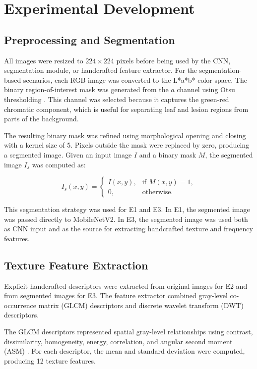 \section{Experimental Development}

\subsection{Preprocessing and Segmentation}

All images were resized to $224 \times 224$ pixels before being used by the CNN, segmentation module, or handcrafted feature extractor. For the segmentation-based scenarios, each RGB image was converted to the L*a*b* color space. The binary region-of-interest mask was generated from the $a$ channel using Otsu thresholding \cite{otsu1979threshold}. This channel was selected because it captures the green-red chromatic component, which is useful for separating leaf and lesion regions from parts of the background.

The resulting binary mask was refined using morphological opening and closing with a kernel size of 5. Pixels outside the mask were replaced by zero, producing a segmented image. Given an input image $I$ and a binary mask $M$, the segmented image $I_s$ was computed as:

\begin{equation}
I_s(x,y) =
\begin{cases}
I(x,y), & \text{if } M(x,y)=1,\\
0, & \text{otherwise.}
\end{cases}
\end{equation}

This segmentation strategy was used for E1 and E3. In E1, the segmented image was passed directly to MobileNetV2. In E3, the segmented image was used both as CNN input and as the source for extracting handcrafted texture and frequency features.

\subsection{Texture Feature Extraction}

Explicit handcrafted descriptors were extracted from original images for E2 and from segmented images for E3. The feature extractor combined gray-level co-occurrence matrix (GLCM) descriptors and discrete wavelet transform (DWT) descriptors.

The GLCM descriptors represented spatial gray-level relationships using contrast, dissimilarity, homogeneity, energy, correlation, and angular second moment (ASM) \cite{haralick1973glcm}. For each descriptor, the mean and standard deviation were computed, producing 12 texture features.

